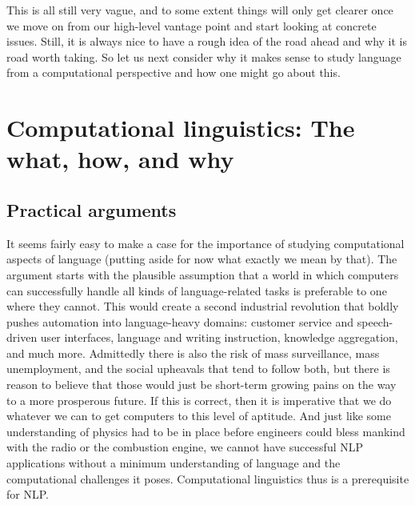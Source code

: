 
This is all still very vague, and to some extent things will only get clearer once we move on from our high-level vantage point and start looking at concrete issues.
Still, it is always nice to have a rough idea of the road ahead and why it is road worth taking.
So let us next consider why it makes sense to study language from a computational perspective and how one might go about this.


\section{Computational linguistics: The what, how, and why}

\subsection{Practical arguments}

It seems fairly easy to make a case for the importance of studying computational aspects of language (putting aside for now what exactly we mean by that). 
The argument starts with the plausible assumption that a world in which computers can successfully handle all kinds of language-related tasks is preferable to one where they cannot.
This would create a second industrial revolution that boldly pushes automation into language-heavy domains: customer service and speech-driven user interfaces, language and writing instruction, knowledge aggregation, and much more.
Admittedly there is also the risk of mass surveillance, mass unemployment, and the social upheavals that tend to follow both, but there is reason to believe that those would just be short-term growing pains on the way to a more prosperous future.
If this is correct, then it is imperative that we do whatever we can to get computers to this level of aptitude.
And just like some understanding of physics had to be in place before engineers could bless mankind with the radio or the combustion engine, we cannot have successful NLP applications without a minimum understanding of language and the computational challenges it poses.
Computational linguistics thus is a prerequisite for NLP\@.

